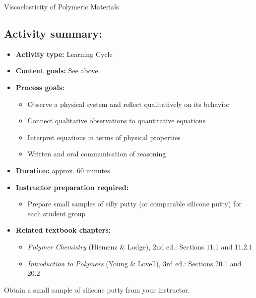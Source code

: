 \begin{activity}{Viscoelasticity of Polymeric Materials}
\begin{instructornotes}
	\subsection*{Activity summary:}
	\begin{itemize}
		\item \textbf{Activity type:} Learning Cycle
		\item \textbf{Content goals:} See above
		\item \textbf{Process goals:} %
			\begin{itemize}
				\item Observe a physical system and reflect qualitatively on its behavior
				\item Connect qualitative observations to quantitative equations
				\item Interpret equations in terms of physical properties 
				\item Written and oral communication of reasoning
			\end{itemize}
		\item \textbf{Duration:} approx. 60 minutes
		\item \textbf{Instructor preparation required:} 
			\begin{itemize}
				\item Prepare small samples of silly putty (or comparable silicone putty) for each student group
			\end{itemize}
		\item \textbf{Related textbook chapters:}
			\begin{itemize}
				\item \emph{Polymer Chemistry} (Hiemenz \& Lodge), 2nd ed.: Sections 11.1 and 11.2.1
				\item \emph{Introduction to Polymers} (Young \& Lovell), 3rd ed.: Sections 20.1 and 20.2
			\end{itemize}
	\end{itemize}

\end{instructornotes}


\begin{model}
\label{model:sillyputty}

	Obtain a small sample of silicone putty from your instructor.
	

\end{model}
\end{activity}
